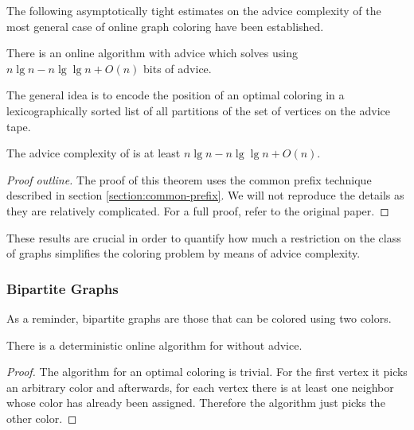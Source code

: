 The following asymptotically tight estimates on the advice complexity of
the most general case of online graph coloring have been established.

\begin{theorem}\label{theorem:general-graphs-upper}
    There is an online algorithm with advice which solves
     using $n \lg n - n \lg\lg n + O(n)$ bits of
    advice.
\end{theorem}

The general idea is to encode the position of an optimal coloring in a
lexicographically sorted list of all partitions of the set of vertices on
the advice tape.

\begin{theorem}\label{theorem:general-graphs-lower}
    The advice complexity of  is at least $n \lg n - n
    \lg\lg n + O(n)$.
\end{theorem}

\begin{proof}[Proof outline]
    The proof of this theorem uses the common prefix technique described
    in section \ref{section:common-prefix}. We will not reproduce the
    details as they are relatively complicated. For a full proof, refer to
    the original paper.
\end{proof}

These results are crucial in order to quantify how much a restriction on
the class of graphs simplifies the coloring problem by means of advice
complexity.

\subsubsection{Bipartite Graphs}

As a reminder, bipartite graphs are those that can be colored using two
colors.

\begin{theorem}\label{theorem:bipartite-connected}
    There is a deterministic online algorithm for
     without advice.
\end{theorem}

\begin{proof}
    The algorithm for an optimal coloring is trivial. For the first vertex
    it picks an arbitrary color and afterwards, for each vertex there is
    at least one neighbor whose color has already been assigned. Therefore
    the algorithm just picks the other color.
\end{proof}


